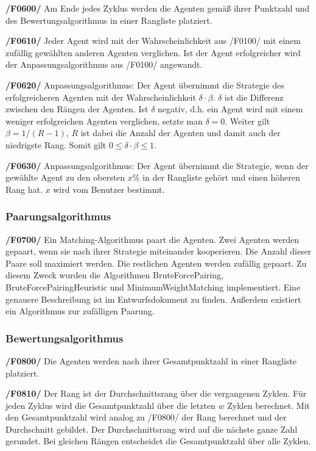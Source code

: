 \textbf{/F0600/}
Am Ende jedes Zyklus werden die Agenten gemäß ihrer Punktzahl und des Bewertungsalgorithmus in einer Rangliste platziert.

\textbf{/F0610/}
Jeder Agent wird mit der Wahrscheinlichkeit aus /F0100/ mit einem zufällig gewählten anderen Agenten verglichen. Ist der Agent erfolgreicher wird der Anpassungsalgorithmus aus /F0100/ angewandt.

\textbf{/F0620/}
Anpassungsalgorithmus: Der Agent übernimmt die Strategie des erfolgreicheren Agenten mit der Wahrscheinlichkeit $\delta \cdot \beta$. $\delta$ ist die Differenz zwischen den Rängen der Agenten. Ist $\delta$ negativ, d.h. ein Agent wird mit einem weniger erfolgreichen Agenten verglichen, setzte man $\delta = 0$. Weiter gilt $\beta = 1/(R-1)$, $R$ ist dabei die Anzahl der Agenten und damit auch der niedrigste Rang. Somit gilt $0 \leq \delta \cdot \beta \leq 1$. 

\textbf{/F0630/}
Anpassungsalgorithmus: Der Agent übernimmt die Strategie, wenn der gewählte Agent zu den obersten $x\%$ in der Rangliste gehört und einen höheren Rang hat. $x$ wird vom Benutzer bestimmt.


\subsubsection{Paarungsalgorithmus}

\textbf{/F0700/}
Ein Matching-Algorithmus paart die Agenten. Zwei Agenten werden gepaart, wenn sie nach ihrer Strategie miteinander kooperieren. Die Anzahl dieser Paare soll maximiert werden. Die restlichen Agenten werden zufällig gepaart. {\color{red} Zu diesem Zweck wurden die Algorithmen BruteForcePairing, BruteForcePairingHeuristic und MinimumWeightMatching implementiert. Eine genauere Beschreibung ist im Entwurfsdokument zu finden. Außerdem existiert ein Algorithmus zur zufälligen Paarung.}

\subsubsection{Bewertungsalgorithmus}

\textbf{/F0800/}
Die Agenten werden nach ihrer Gesamtpunktzahl in einer Rangliste platziert.

\textbf{/F0810/}
Der Rang ist der Durchschnittsrang über die vergangenen Zyklen. Für jeden Zyklus wird die Gesamtpunktzahl über die letzten $w$ Zyklen berechnet. Mit den Gesamtpunktzahl wird analog zu /F0800/ der Rang berechnet und der Durchschnitt gebildet. Der Durchschnittsrang wird auf die nächste ganze Zahl gerundet. Bei gleichen Rängen entscheidet die Gesamtpunktzahl über alle Zyklen.

